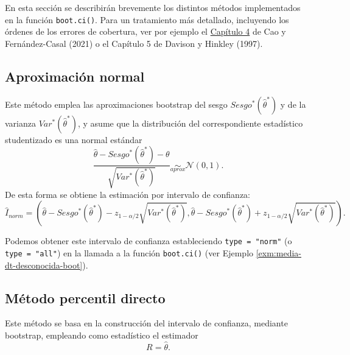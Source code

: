 \documentclass[
]{book}
\theoremstyle{break}
\theoremstyle{nonumberplain}
\begin{document}
En esta sección se describirán brevemente los distintos métodos implementados en la función \texttt{boot.ci()}.
Para un tratamiento más detallado, incluyendo los órdenes de los errores de cobertura, ver por ejemplo el \href{https://rubenfcasal.github.io/book_remuestreo/icboot.html}{Capítulo 4} de Cao y Fernández-Casal (2021) o el Capítulo 5 de Davison y Hinkley (1997).

\hypertarget{boot-ic-norm}{%
\subsection{Aproximación normal}\label{boot-ic-norm}}

Este método emplea las aproximaciones bootstrap del sesgo \(Sesgo^{\ast}\left( \hat{\theta}^{\ast} \right)\) y de la varianza \(Var^{\ast}\left( \hat{\theta}^{\ast} \right)\), y asume que la distribución del correspondiente estadístico studentizado es una normal estándar
\[\frac{\hat{\theta} - Sesgo^{\ast}\left( \hat{\theta}^{\ast} \right) - \theta}{\sqrt{Var^{\ast}\left( \hat{\theta}^{\ast} \right)}} \underset{aprox}{\sim }\mathcal{N}\left( 0, 1 \right).\]
De esta forma se obtiene la estimación por intervalo de confianza:
\[\hat{I}_{norm}=\left( \hat{\theta} - Sesgo^{\ast}\left( \hat{\theta}^{\ast} \right) - z_{1-\alpha /2}\sqrt{Var^{\ast}\left( \hat{\theta}^{\ast} \right)},\hat{\theta} - Sesgo^{\ast}\left( \hat{\theta}^{\ast} \right) + z_{1 - \alpha /2}\sqrt{Var^{\ast}\left( \hat{\theta}^{\ast} \right)} \right).\]

Podemos obtener este intervalo de confianza estableciendo \texttt{type\ =\ "norm"} (o \texttt{type\ =\ "all"}) en la llamada a la función \texttt{boot.ci()} (ver Ejemplo \ref{exm:media-dt-desconocida-boot}).

\hypertarget{boot-ic-perc}{%
\subsection{Método percentil directo}\label{boot-ic-perc}}

Este método se basa en la construcción del intervalo de confianza, mediante bootstrap, empleando como estadístico el estimador \[R = \hat{\theta}.\]
\end{document}
